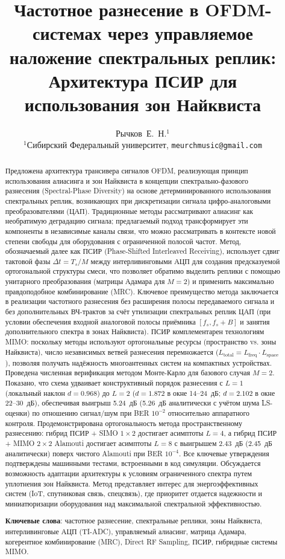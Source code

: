 \documentclass[a4paper,12pt]{article}
\title{\textbf{Частотное разнесение в OFDM-системах через управляемое наложение спектральных реплик: Архитектура ПСИР для использования зон Найквиста}}
\author{Рычков~Е.~Н.$^{1}$ \\ $^{1}$Сибирский Федеральный университет, \texttt{meurchmusic@gmail.com}}
\date{}
\numberwithin{equation}{section}
\begin{document}
\maketitle

\begin{abstract}
Предложена архитектура трансивера сигналов OFDM, реализующая принцип использования алиасинга и зон Найквиста в концепции
спектрально-фазового разнесения (Spectral-Phase Diversity) на основе детерминированного использования спектральных реплик, возникающих при дискретизации сигнала цифро-аналоговыми преобразователями (ЦАП). Традиционные методы рассматривают алиасинг как необратимую деградацию сигнала; предлагаемый подход трансформирует эти компоненты в независимые каналы связи, что можно рассматривать в контексте новой степени свободы для оборудования с ограниченной полосой частот. Метод, обозначаемый далее как ПСИР (Phase-Shifted Interleaved Receiving), использует сдвиг тактовой фазы $\Delta t = T_s/M$ между интерливинговыми АЦП для создания предсказуемой ортогональной структуры смеси, что позволяет обратимо выделить реплики с помощью унитарного преобразования (матрицы Адамара для $M=2$) и применить максимально правдоподобное комбинирование (MRC). Ключевое преимущество метода заключается в реализации частотного разнесения без расширения полосы передаваемого сигнала и без дополнительных ВЧ-трактов за счёт утилизации спектральных реплик ЦАП (при условии обеспечения входной аналоговой полосы приёмника $[f_s, f_s+B]$ и занятия дополнительного спектра в зонах Найквиста). ПСИР комплементарен технологиям MIMO: поскольку методы используют ортогональные ресурсы (пространство vs. зоны Найквиста), число независимых ветвей разнесения перемножается ($L_{\text{total}} = L_{\text{freq}} \cdot L_{\text{space}}$), позволяя получать надёжность многоантенных систем на компактных устройствах. Проведена численная верификация методом Монте-Карло для базового случая $M=2$. Показано, что схема удваивает конструктивный порядок разнесения с $L=1$ (локальный наклон $d = 0.968$) до $L=2$ ($d = 1.872$ в окне 14--24~дБ; $d = 2.102$ в окне 22--30~дБ), обеспечивая выигрыш 5.24~дБ (5.26~дБ аналитически с учётом шума LS-оценки) по отношению сигнал/шум при BER $10^{-2}$ относительно аппаратного контроля. Продемонстрирована ортогональность метода пространственному разнесению: гибрид ПСИР + SIMO $1{\times}2$ достигает асимптоты $L=4$, а гибрид ПСИР + MIMO $2{\times}2$ Alamouti достигает асимптоты $L=8$ с выигрышем 2.43~дБ (2.45~дБ аналитически) поверх чистого Alamouti при BER $10^{-4}$. Все ключевые утверждения подтверждены машинными тестами, встроенными в код симуляции. Обсуждается возможность адаптации архитектуры к условиям ограниченного спектра путем уплотнения зон Найквиста. Метод представляет интерес для энергоэффективных систем (IoT, спутниковая связь, спецсвязь), где приоритет отдается надежности и миниатюризации оборудования над максимальной спектральной эффективностью.

\vspace{0.3cm}
\noindent\textbf{Ключевые слова}: частотное разнесение, спектральные реплики, зоны Найквиста, интерливинговые АЦП (TI-ADC), управляемый алиасинг, матрица Адамара, когерентное комбинирование (MRC), Direct RF Sampling, ПСИР, гибридные системы MIMO.
\end{abstract}
\end{document}
